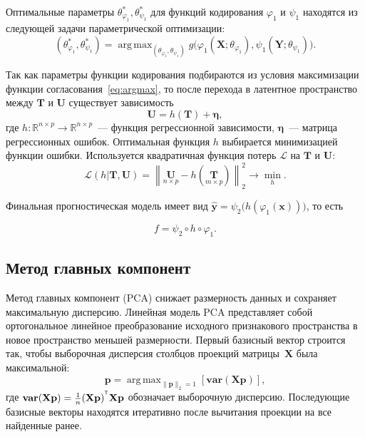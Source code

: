 \documentclass[12pt]{article}
\DeclareMathOperator*{\argmax}{arg\,max}
\newcommand{\bx}{\mathbf{x}}
\newcommand{\by}{\mathbf{y}}
\newcommand{\bY}{\mathbf{Y}}
\newcommand{\bX}{\mathbf{X}}
\newcommand{\bp}{\mathbf{p}}
\newcommand{\bT}{\mathbf{T}}
\newcommand{\bU}{\mathbf{U}}
\newcommand{\T}{^{\text{\tiny\sffamily\upshape\mdseries T}}}
\begin{document}
Оптимальные параметры $\theta_{\varphi_1}^{*}, \theta_{\psi_1}^{*}$ для функций кодирования $\varphi_1$  и $\psi_1$ находятся из следующей задачи параметрической оптимизации:
\begin{equation}
	(\theta_{\varphi_1}^{*}, \theta_{\psi_1}^{*}) = \argmax_{(\theta_{\varphi_1}, \theta_{\psi_1})} g\bigl( \varphi_1(\bX; \theta_{\varphi_1}), \psi_1(\bY; \theta_{\psi_1})\bigr).
\label{eq:argmax}
\end{equation}

Так как параметры функции кодирования подбираются из условия максимизации функции согласования~\eqref{eq:argmax}, то после перехода в латентное пространство между $\mathbf{T}$ и $\mathbf{U}$ существует зависимость
\begin{equation}
	\bU = h(\bT) +  \boldsymbol{\eta},
	\label{eq:reg2}
\end{equation}
где $h: \mathbb{R}^{n \times p} \to \mathbb{R}^{n \times p}$~--- функция регрессионной зависимости,  $\boldsymbol{\eta}$~--- матрица регрессионных ошибок.
Оптимальная функция $h$ выбирается минимизацией функции ошибки. Используется квадратичная функция потерь $\mathcal{L}$ на $\bT$ и $\bU$:
\begin{equation}
	\mathcal{L}(h | {\bT}, {\bU}) = {\left\| \underset{n \times p}{\bU}  - h(\underset{m \times p}{\bT}) \right\| }_2^2 \rightarrow\min_{h}.
	\label{eq:loss_function}
\end{equation}

Финальная прогностическая модель имеет вид
$\widehat{\by} = \psi_2\bigl(h(\varphi_1(\bx))\bigr)$, то есть

\begin{equation}
	f = \psi_2 \circ h \circ \varphi_1.
	\label{eq:f}
\end{equation}

\subsection{Метод главных компонент}

Метод главных компонент (PCA) снижает размерность данных и сохраняет максимальную дисперсию. Линейная модель PCA представляет собой ортогональное линейное преобразование исходного признакового пространства в новое пространство меньшей размерности. Первый базисный вектор строится так, чтобы выборочная дисперсия столбцов проекций матрицы~$\bX$ была максимальной:
\begin{equation}
	\bp = \argmax_{\|\bp\|_{2} = 1} [\textbf{var}(\bX \textbf{p})],
	\label{eq:PCA}
\end{equation}
где $\textbf{var}(\bX \textbf{p}) = \frac{1}{n} (\bX \textbf{p})^{\T}\bX \textbf{p}$ обозначает выборочную дисперсию. Последующие базисные векторы находятся итеративно после вычитания проекции на все найденные ранее.
\end{document}
